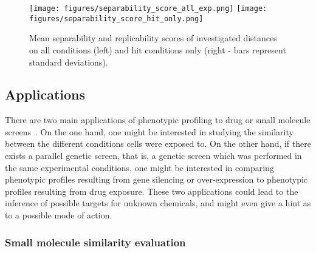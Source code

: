 \begin{figure*}[ht!]
\centerline{
\texttt{[image: figures/separability\_score\_all\_exp.png]}
\texttt{[image: figures/separability\_score\_hit\_only.png]}
}
\caption{Mean separability and replicability scores of investigated distances on all conditions (left) and hit conditions only (right - bars represent standard deviations).}
\label{separability}
\end{figure*}

\subsection{Applications}
\label{sec:applications}
There are two main applications of phenotypic profiling to drug or small molecule screens~\cite{pmid17401369}. On the one hand, one might be interested in studying the similarity between the different conditions cells were exposed to. On the other hand, if there exists a parallel genetic screen, that is, a genetic screen which was performed in the same experimental conditions, one might be interested in comparing phenotypic profiles resulting from gene silencing or over-expression to phenotypic profiles resulting from drug exposure. These two applications could lead to the inference of possible targets for unknown chemicals, and might even give a hint as to a possible mode of action.

\subsubsection{Small molecule similarity evaluation}

